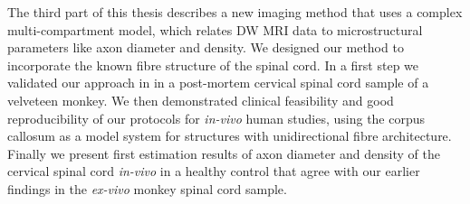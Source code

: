 {The third part of this thesis describes a new imaging method that uses a complex multi-compartment model, which relates DW MRI data to microstructural parameters like axon diameter and density. We designed our method to incorporate the known fibre structure of the spinal cord. In a first step we validated our approach in in a post-mortem cervical spinal cord sample of a velveteen monkey. We then demonstrated clinical feasibility and good reproducibility of our protocols for \emph{in-vivo} human studies, using the corpus callosum as a model system for structures with unidirectional fibre architecture. Finally we present first estimation results of axon diameter and density of the cervical spinal cord \emph{in-vivo} in a healthy control that agree with our earlier findings in the \emph{ex-vivo} monkey spinal cord sample.
\vfill
}
\endgroup			


